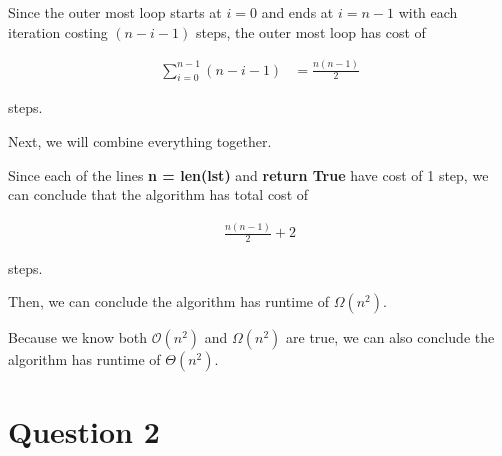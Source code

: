 \documentclass[12pt]{article}
\begin{document}
\begin{enumerate}[a.]
    Since the outer most loop starts at $i = 0$ and ends at $i = n-1$ with each iteration
    costing $(n - i -1)$ steps, the outer most loop has cost of

    \begin{align}
        \sum\limits_{i=0}^{n-1} (n-i-1) &= \frac{n(n-1)}{2}
    \end{align}

    steps.

    \bigskip

    Next, we will combine everything together.

    \bigskip

    Since each of the lines \textbf{n = len(lst)} and \textbf{return True} have
    cost of 1 step, we can conclude that the algorithm has total cost of

    \begin{align}
        \frac{n(n-1)}{2} + 2
    \end{align}

    steps.

    \bigskip

    Then, we can conclude the algorithm has runtime of $\Omega(n^2)$.

    \bigskip

    Because we know both $\mathcal{O}(n^2)$ and $\Omega(n^2)$ are true, we can
    also conclude the algorithm has runtime of $\Theta(n^2)$.

\end{enumerate}

\section*{Question 2}
\end{document}
